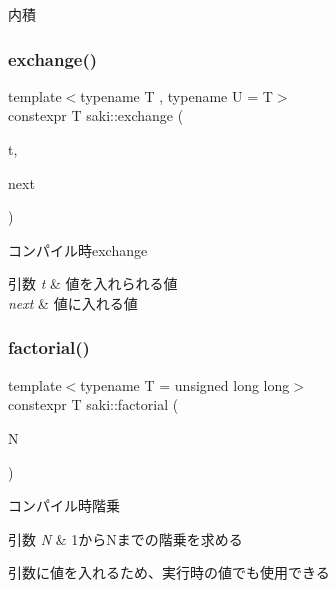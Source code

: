 内積 

\mbox{\label{namespacesaki_ad2deeae63db0667c034ff616bf6e3886}} 
\subsubsection{\texorpdfstring{exchange()}{exchange()}}
{\footnotesize\ttfamily template$<$typename T , typename U  = T$>$ \\
constexpr T saki\+::exchange (\begin{DoxyParamCaption}\item[{T \&}]{t,  }\item[{U}]{next }\end{DoxyParamCaption})}



コンパイル時exchange 


\begin{DoxyParams}{引数}
{\em t} & 値を入れられる値 \\
\hline
{\em next} & 値に入れる値 \\
\hline
\end{DoxyParams}
\mbox{\label{namespacesaki_a59cd7e099937e5f8bcf5aa612745690c}} 
\subsubsection{\texorpdfstring{factorial()}{factorial()}\hspace{0.1cm}{\footnotesize\ttfamily [1/2]}}
{\footnotesize\ttfamily template$<$typename T  = unsigned long long$>$ \\
constexpr T saki\+::factorial (\begin{DoxyParamCaption}\item[{unsigned int}]{N }\end{DoxyParamCaption})}



コンパイル時階乗 


\begin{DoxyParams}{引数}
{\em N} & 1から\+Nまでの階乗を求める\\
\hline
\end{DoxyParams}
引数に値を入れるため、実行時の値でも使用できる \mbox{\label{namespacesaki_a9dead910b791cee99cf82d1bd2a5d90c}} 
